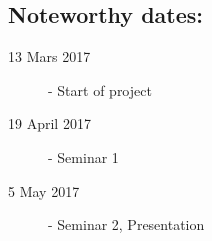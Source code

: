 






\subsection{Noteworthy dates:}

\begin{description}
  \item [13 Mars 2017] - Start of project
  \item [19 April 2017] - Seminar 1
  \item [5 May 2017] - Seminar 2, Presentation
\end{description}



